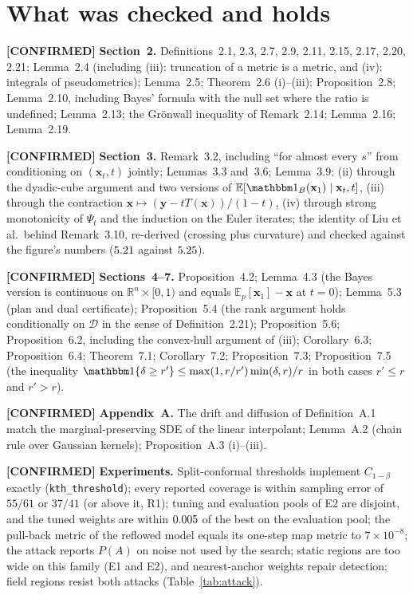 \documentclass[11pt]{article}
\newcommand{\RR}{\mathbb{R}}
\newcommand{\E}{\mathbb{E}}
\newcommand{\bx}{\mathbf{x}}
\newcommand{\by}{\mathbf{y}}
\newcommand{\cD}{\mathcal{D}}
\newcommand{\Ok}{\textcolor{okGreen}{\textbf{[CONFIRMED]}}}
\begin{document}
\section{What was checked and holds}\label{sec:ok}
\begingroup\sloppy
\noindent\Ok{} \textbf{Section~2.} Definitions~2.1, 2.3, 2.7, 2.9, 2.11, 2.15, 2.17, 2.20, 2.21; Lemma~2.4 (including (iii): truncation
of a metric is a metric, and (iv): integrals of pseudometrics); Lemma~2.5; Theorem~2.6 (i)--(iii); Proposition~2.8; Lemma~2.10,
including Bayes' formula with the null set where the ratio is undefined; Lemma~2.13; the Gr\"onwall inequality of Remark~2.14;
Lemma~2.16; Lemma~2.19.

\noindent\Ok{} \textbf{Section~3.} Remark~3.2, including ``for almost every $s$'' from conditioning on $(\bx_t,t)$ jointly;
Lemmas~3.3 and~3.6; Lemma~3.9: (ii) through the dyadic-cube argument and two versions of $\E[\mathbbm1_B(\bx_1)\mid\bx_t,t]$, (iii)
through the contraction $\bx\mapsto(\by-tT(\bx))/(1-t)$, (iv) through strong monotonicity of $\Psi_t$ and the induction on the
Euler iterates; the identity of Liu et al.\ behind Remark~3.10, re-derived (crossing plus curvature) and checked against the
figure's numbers ($5.21$ against $5.25$).

\noindent\Ok{} \textbf{Sections~4--7.} Proposition~4.2; Lemma~4.3 (the Bayes version is continuous on $\RR^n\times[0,1)$ and equals
$\E_p[\bx_1]-\bx$ at $t=0$); Lemma~5.3 (plan and dual certificate); Proposition~5.4 (the rank argument holds conditionally on $\cD$
in the sense of Definition~2.21); Proposition~5.6; Proposition~6.2, including the convex-hull argument of (iii); Corollary~6.3;
Proposition~6.4; Theorem~7.1; Corollary~7.2; Proposition~7.3; Proposition~7.5 (the inequality
$\mathbbm1\{\delta\ge r'\}\le\max(1,r/r')\min(\delta,r)/r$ in both cases $r'\le r$ and $r'>r$).

\noindent\Ok{} \textbf{Appendix~A.} The drift and diffusion of Definition~A.1 match the marginal-preserving SDE of the linear
interpolant; Lemma~A.2 (chain rule over Gaussian kernels); Proposition~A.3 (i)--(iii).

\noindent\Ok{} \textbf{Experiments.} Split-conformal thresholds implement $C_{1-\beta}$ exactly (\texttt{kth\_threshold}); every
reported coverage is within sampling error of $55/61$ or $37/41$ (or above it, R1); tuning and evaluation pools of E2 are disjoint, and
the tuned weights are within $0.005$ of the best on the evaluation pool; the pull-back metric of the reflowed model equals its
one-step map metric to $7\times10^{-8}$; the attack reports $P(A)$ on noise not used by the search; static regions are too wide on
this family (E1 and E2), and nearest-anchor weights repair detection; field regions resist both attacks (Table~\ref{tab:attack}).
\end{document}
